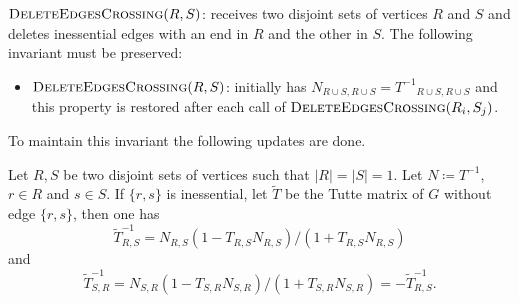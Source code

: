 $\textsc{DeleteEdgesCrossing}(R, S)$: receives two disjoint sets of vertices \(R\) and \(S\) and 
deletes inessential edges with an end in \(R\) and the other in \(S\).
The following invariant must be preserved:
\begin{itemize}
    \item \(\textsc{DeleteEdgesCrossing}(R, S)\): initially has \(N_{R \cup S, R \cup S} = {T^{-1}}_{R \cup S, R \cup S}\) and this property is restored after each call 
    of \(\textsc{DeleteEdgesCrossing}(R_i, S_j)\).
\end{itemize}
To maintain this invariant the following updates are done. 

\begin{theorem}[Update 1]
\label{update:1}
    Let \(R, S\) be two disjoint sets of vertices such that \(|R| = |S| = 1\).
    Let \(N \coloneqq T^{-1}\), \(r \in R\) and \(s \in S\).
    If \(\{r, s\}\) is inessential, let \(\tilde{T}\) be the Tutte matrix of \(G\) without edge \(\{r, s\}\), then one has
    \[
        \tilde{T}^{-1}_{R, S} = N_{R, S} (1 - T_{R, S} N_{R, S}) / (1 + T_{R, S} N_{R, S})
    \]
    and
    \[
        \tilde{T}^{-1}_{S, R} = N_{S, R} (1 - T_{S, R} N_{S, R}) / (1 + T_{S, R} N_{S, R}) = -\tilde{T}^{-1}_{R, S}.
    \]
\end{theorem}

